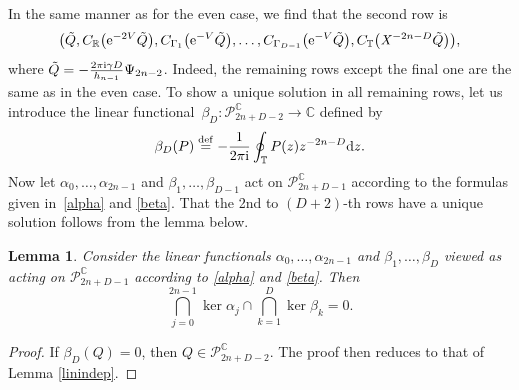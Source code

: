 \documentclass[pdftex]{sigma}
\numberwithin{equation}{section}
\newtheorem{Lemma}[Theorem]{Lemma}
\begin{document}
In the same manner as for the even case, we find that the second row is
\begin{equation*}
\big( \tilde{Q} , C_{\mathbb{R}}\big({\rm e}^{-2V} \tilde{Q}\big) , C_{\Gamma_1}\big({\rm e}^{-V} \tilde{Q}\big) , \dots , C_{\Gamma_{D-1}}\big({\rm e}^{-V} \tilde{Q}\big) , C_{\mathbb{T}}\big( \mathit{X}^{-2n-D} \tilde{Q}\big) \big),
\end{equation*}
 where $\tilde{Q} = -\frac{2\pi {\rm i} \gamma D}{h_{n-1}} \Psi_{2n-2}$. Indeed, the remaining rows except the final one are the same as in the even case. To show a unique solution in all remaining rows, let us introduce the linear functional~${\beta_D \colon \mathscr{P}^\mathbb{C}_{2n+D-2} \longrightarrow \mathbb{C}}$ defined by
\[
\beta_D(P) \overset{\mathrm{def}}{=}- \frac{1}{2\pi {\rm i}} \oint_\mathbb{T} P(z) z^{-2n-D} {\rm d}z.
\]
Now let $\alpha_0, \dots, \alpha_{2n-1}$ and $\beta_1, \dots, \beta_{D-1}$ act on $\mathscr{P}^\mathbb{C}_{2n+D-1}$ according to the formulas given in~\eqref{alpha} and \eqref{beta}. That the 2nd to $(D+2)$-th rows have a unique solution follows from the lemma below.
\begin{Lemma} Consider the linear functionals $\alpha_0, \dots, \alpha_{2n-1}$ and $\beta_1, \dots, \beta_{D}$ viewed as acting on $\mathscr{P}^\mathbb{C}_{2n+D-1}$ according to \eqref{alpha} and \eqref{beta}. Then
\begin{equation*}
\bigcap_{j=0}^{2n-1} \ker \alpha_j \cap \bigcap_{k=1}^{D} \ker \beta_k = 0.
\end{equation*}
\end{Lemma}
\begin{proof}
If $\beta_D (Q) = 0$, then $Q \in \mathscr{P}^\mathbb{C}_{2n+D-2}$. The proof then reduces to that of Lemma \ref{linindep}.
\end{proof}
\end{document}
